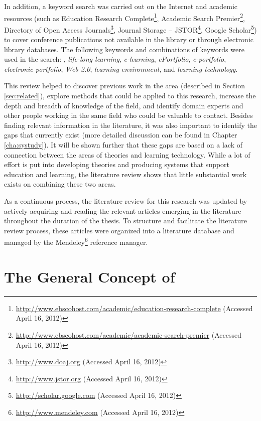 In addition, a keyword search was carried out on the Internet and academic
resources (such as Education Research
Complete\footnote{\url{http://www.ebscohost.com/academic/education-research-complete}
(Accessed April 16, 2012)}, Academic Search
Premier\footnote{\url{http://www.ebscohost.com/academic/academic-search-premier}
(Accessed April 16, 2012)}, Directory of Open Access
Journals\footnote{\url{http://www.doaj.org} (Accessed April 16, 2012)}, Journal
Storage -- JSTOR\footnote{\url{http://www.jstor.org} (Accessed April 16, 2012)},
Google Scholar\footnote{\url{http://scholar.google.com} (Accessed April 16,
2012)}) to cover conference publications not available in the library or through
electronic library databases. The following keywords and combinations of
keywords were used in the search: \textit{\LLLsn}, \textit{life-long learning},
\textit{e-learning}, \textit{ePortfolio}, \textit{e-portfolio},
\textit{electronic portfolio}, \textit{Web 2.0}, \textit{learning environment},
and \textit{learning technology}.

This review helped to discover previous work in the area (described in Section
\ref{sec:related}), explore methods that could be applied to this research,
increase the depth and breadth of knowledge of the field, and identify domain
experts and other people working in the same field who could be valuable to
contact. Besides finding relevant information in the literature, it was also
important to identify the gaps that currently exist (more detailed discussion
can be found in Chapter \ref{cha:systudy}). It will be shown further that these
gaps are based on a lack of connection between the areas of \LLLs theories and
learning technology. While a lot of effort is put into developing theories and
producing systems that support education and learning, the literature review
shows that little substantial work exists on combining these two areas.

As a continuous process, the literature review for this research was updated by
actively acquiring and reading the relevant articles emerging in the literature
throughout the duration of the thesis. To structure and facilitate the
literature review process, these articles were organized into a literature
database and managed by the Mendeley\footnote{\url{http://www.mendeley.com}
(Accessed April 16, 2012)} reference manager.

\section{The General Concept of \LLLc}
\label{sec:concepts}
